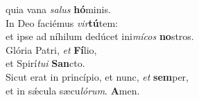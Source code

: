 \oddverse quia vana \textit{sa}\textit{lus} \textbf{hó}minis.\\
\evenverse In Deo faciémus \textit{vir}\textbf{tú}tem:~\*\\
\evenverse et ipse ad níhilum dedúcet ini\textit{mí}\textit{cos} \textbf{no}stros.\\
\oddverse Glória Patri, \textit{et} \textbf{Fí}lio,~\*\\
\oddverse et Spirí\textit{tu}\textit{i} \textbf{San}cto.\\
\evenverse Sicut erat in princípio, et nunc, \textit{et} \textbf{sem}per,~\*\\
\evenverse et in sǽcula sæcu\textit{ló}\textit{rum}. \textbf{A}men.\\
